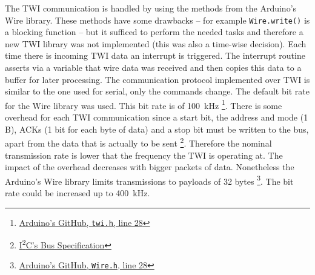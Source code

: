 The TWI communication is handled by using the methods from the Arduino's Wire library. These methods have some drawbacks -- for example \texttt{Wire.write()} is a blocking function -- but it sufficed to perform the needed tasks and therefore a new TWI library was not implemented (this was also a time-wise decision). Each time there is incoming TWI data an interrupt is triggered. The interrupt routine asserts via a variable that wire data was received and then copies this data to a buffer for later processing. The communication protocol implemented over TWI is similar to the one used for serial, only the commands change. The default bit rate for the Wire library was used. This bit rate is of \SI{100}{\kilo\hertz} \footnote{\href{https://github.com/arduino/Arduino/blob/435fc323e0ab3b03bc5835e5309b5022bf57388a/hardware/arduino/avr/libraries/Wire/utility/twi.h#L28}{Arduino's GitHub, \texttt{twi.h}, line 28}}. There is some overhead for each TWI communication since a start bit, the address and mode (1 B), ACKs (1 bit for each byte of data) and a stop bit must be written to the bus, apart from the data that is actually to be sent \footnote{\href{http://i2c.info/i2c-bus-specification}{I\textsuperscript{2}C's Bus Specification}}. Therefore the nominal transmission rate is lower that the frequency the TWI is operating at. The impact of the overhead decreases with bigger packets of data. Nonetheless the Arduino's Wire library limits transmissions to payloads of 32 bytes \footnote{\href{https://github.com/arduino/Arduino/blob/435fc323e0ab3b03bc5835e5309b5022bf57388a/hardware/arduino/avr/libraries/Wire/utility/twi.h#L28}{Arduino's GitHub, \texttt{Wire.h}, line 28}}. The bit rate could be increased up to \SI{400}{\kilo\hertz}.

